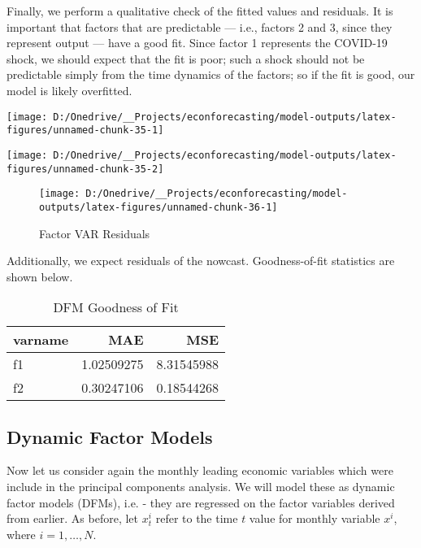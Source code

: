 \documentclass[11pt, letterpaper]{article}\usepackage[]{graphicx}\usepackage[]{color}
\begin{document}
Finally, we perform a qualitative check of the fitted values and residuals. It is important that factors that are predictable --- i.e., factors 2 and 3, since they represent output --- have a good fit. Since factor 1 represents the COVID-19 shock, we should expect that the fit is poor; such a shock should not be predictable simply from the time dynamics of the factors; so if the fit is good, our model is likely overfitted.


{\centering \texttt{[image: D:/Onedrive/\_\_Projects/econforecasting/model-outputs/latex-figures/unnamed-chunk-35-1]} 

}




{\centering \texttt{[image: D:/Onedrive/\_\_Projects/econforecasting/model-outputs/latex-figures/unnamed-chunk-35-2]} 

}





\begin{figure}[H]

{\centering \texttt{[image: D:/Onedrive/\_\_Projects/econforecasting/model-outputs/latex-figures/unnamed-chunk-36-1]} 

}

\caption[Factor VAR Residuals]{Factor VAR Residuals}\label{fig:unnamed-chunk-36}
\end{figure}



Additionally, we expect residuals of the nowcast. Goodness-of-fit statistics are shown below.
\begin{table}[H]
\centering
\begingroup\footnotesize
\begin{tabular}{lrr}
  \hline
varname & MAE & MSE \\ 
  \hline
f1 & 1.02509275 & 8.31545988 \\ 
  f2 & 0.30247106 & 0.18544268 \\ 
   \hline
\end{tabular}
\endgroup
\caption{DFM Goodness of Fit} 
\end{table}




\subsection{Dynamic Factor Models}
Now let us consider again the monthly leading economic variables which were include in the principal components analysis. We will model these as dynamic factor models (DFMs), i.e. - they are regressed on the factor variables derived from earlier. As before, let $x^i_t$ refer to the time $t$ value for monthly variable $x^i$, where $i = 1, \dots, N$.
\end{document}
